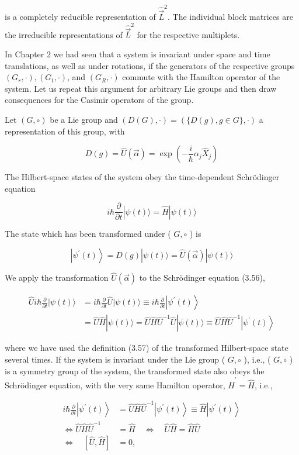 \documentclass[10pt, letterpaper]{article}
\begin{document}
is a completely reducible representation of $\hat{\vec{L}}^{2}$. The individual block matrices are the irreducible representations of $\hat{\vec{L}}^{2}$ for the respective multiplets.

In Chapter 2 we had seen that a system is invariant under space and time translations, as well as under rotations, if the generators of the respective groups $\left(G_{r}, \cdot\right),\left(G_{t}, \cdot\right)$, and $\left(G_{R}, \cdot\right)$ commute with the Hamilton operator of the system. Let us repeat this argument for arbitrary Lie groups and then draw consequences for the Casimir operators of the group.

Let $(G, \circ)$ be a Lie group and $(D(G), \cdot)=(\{D(g), g \in G\}, \cdot)$ a representation of this group, with

$$
D(g)=\hat{U}(\vec{\alpha})=\exp \left(-\frac{i}{\hbar} \alpha_{j} \hat{X}_{j}\right)
$$

The Hilbert-space states of the system obey the time-dependent Schrödinger equation

$$
i \hbar \frac{\partial}{\partial t}|\psi(t)\rangle=\hat{H}|\psi(t)\rangle
$$

The state which has been transformed under ( $G, \circ$ ) is

$$
\left|\psi^{\prime}(t)\right\rangle=D(g)|\psi(t)\rangle=\hat{U}(\vec{\alpha})|\psi(t)\rangle
$$

We apply the transformation $\hat{U}(\vec{\alpha})$ to the Schrödinger equation (3.56),

$$
\begin{aligned}
\hat{U} i \hbar \frac{\partial}{\partial t}|\psi(t)\rangle & =i \hbar \frac{\partial}{\partial t} \hat{U}|\psi(t)\rangle \equiv i \hbar \frac{\partial}{\partial t}\left|\psi^{\prime}(t)\right\rangle \\
& =\hat{U} \hat{H}|\psi(t)\rangle=\hat{U} \hat{H} \hat{U}^{-1} \hat{U}|\psi(t)\rangle \equiv \hat{U} \hat{H} \hat{U}^{-1}\left|\psi^{\prime}(t)\right\rangle
\end{aligned}
$$

where we have used the definition (3.57) of the transformed Hilbert-space state several times. If the system is invariant under the Lie group ( $G, \circ$ ), i.e., ( $G, \circ$ ) is a symmetry group of the system, the transformed state also obeys the Schrödinger equation, with the very same Hamilton operator, $\hat{H}^{\prime}=\hat{H}$, i.e.,

$$
\begin{aligned}
i \hbar \frac{\partial}{\partial t}\left|\psi^{\prime}(t)\right\rangle & =\hat{U} \hat{H} \hat{U}^{-1}\left|\psi^{\prime}(t)\right\rangle \equiv \hat{H}\left|\psi^{\prime}(t)\right\rangle \\
\Longleftrightarrow \hat{U} \hat{H} \hat{U}^{-1} & =\hat{H} \quad \Longleftrightarrow \quad \hat{U} \hat{H}=\hat{H} \hat{U} \\
\Longleftrightarrow \quad[\hat{U}, \hat{H}] & =0,
\end{aligned}
$$
\end{document}
